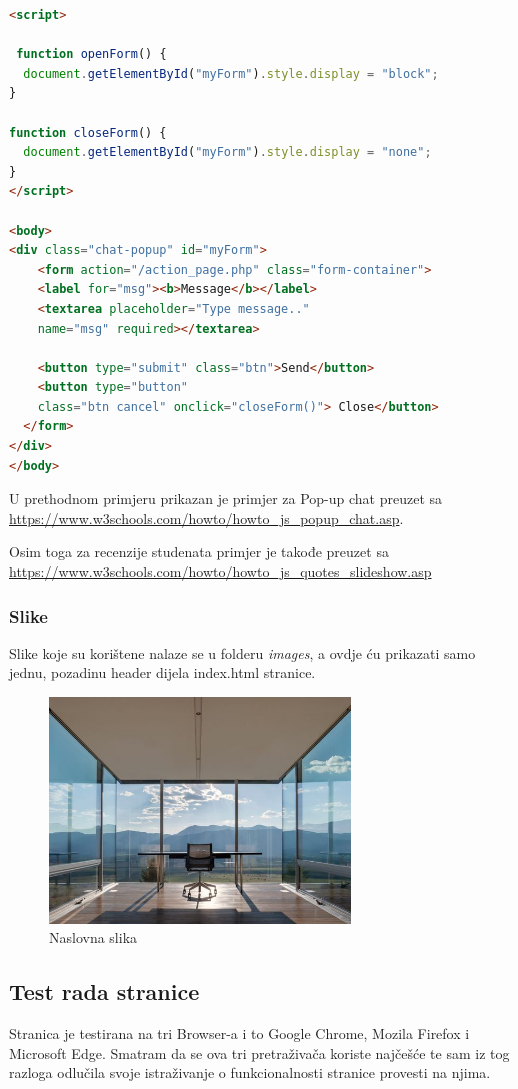 \documentclass[a4paper]{article}
\begin{document}
\begin{lstlisting}[language=HTML]
<script>
        
 function openForm() {
  document.getElementById("myForm").style.display = "block";
}

function closeForm() {
  document.getElementById("myForm").style.display = "none";
}
</script>

<body>
<div class="chat-popup" id="myForm">
    <form action="/action_page.php" class="form-container">
    <label for="msg"><b>Message</b></label>
    <textarea placeholder="Type message.." 
    name="msg" required></textarea>
    
    <button type="submit" class="btn">Send</button>
    <button type="button" 
    class="btn cancel" onclick="closeForm()"> Close</button>
  </form>
</div>
</body>
\end{lstlisting}

U prethodnom primjeru prikazan je primjer za Pop-up chat preuzet sa \url{https://www.w3schools.com/howto/howto_js_popup_chat.asp}. 

Osim toga za recenzije studenata primjer je takođe preuzet sa \url{https://www.w3schools.com/howto/howto_js_quotes_slideshow.asp}

\subsubsection{Slike}
Slike koje su korištene nalaze se u folderu \emph{images}, a ovdje ću prikazati samo jednu, pozadinu header dijela index.html stranice. 

\begin{figure}[htp]
    \centering
    \includegraphics[width=8cm]{slika2}
    \caption{Naslovna slika}
    \label{fig:my_label}
\end{figure}

\subsection{Test rada stranice}
Stranica je testirana na tri Browser-a i to Google Chrome, Mozila Firefox i Microsoft Edge. Smatram da se ova tri pretraživača koriste najčešće te sam iz tog razloga odlučila svoje istraživanje o funkcionalnosti stranice provesti na njima.\cite{citiraj} 



\end{document}

